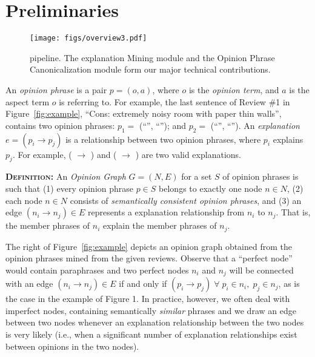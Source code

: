 \section{Preliminaries} \label{sec:overview}
\begin{figure}[t]
    \centering
    \texttt{[image: figs/overview3.pdf]}
    \caption{\system{} pipeline. The explanation Mining module and the Opinion Phrase Canonicalization module form our major technical contributions.}
    \label{fig:overview}
    \vspace{-2mm}
\end{figure}


An \textsl{opinion phrase} is a pair $p=(o, a)$, where $o$ is the \textsl{opinion term}, and $a$ is the aspect term $o$ is referring to. 
For example, the last sentence of Review \#1 in Figure~\ref{fig:example}, ``Cons: extremely noisy room with paper thin walls'', contains two opinion phrases: $p_1=$ (``'', ``''); and $p_2=$ (``'', ``''). 
An \textsl{explanation} $e = (p_i\rightarrow p_j)$ is a relationship between two opinion phrases, where $p_i$ explains $p_j$. For example, ( $\rightarrow$ ) and ( $\rightarrow$ ) are two valid explanations.\smallskip

\noindent \textsc{\textbf{Definition:}} An \textsl{Opinion  Graph} $G = (N,E)$ for a set $S$ of opinion phrases is such that 
(1) every opinion phrase $p\in S$ belongs to exactly one node $n\in N$,
(2) each node $n\in N$ consists of {\em semantically consistent opinion phrases}, and 
(3) an edge \mbox{$(n_i\rightarrow n_j) \in E$} represents a explanation relationship from $n_i$ to $n_j$. That is, the member phrases of $n_i$ explain the member phrases of $n_j$.\smallskip

The right of Figure~\ref{fig:example} depicts an opinion graph obtained from the opinion phrases mined from the given reviews. Observe that a ``perfect node'' would contain paraphrases and two perfect nodes $n_i$ and $n_j$ will be connected with an edge \mbox{$(n_i\rightarrow n_j) \in E$} if and only if $(p_i\rightarrow p_j) \; \forall \; p_i \in n_i, \; p_j \in n_j$, as is the case in the example of Figure 1. In practice, however, we often deal with imperfect nodes, containing semantically \textsl{similar} phrases and we draw an edge between two nodes whenever
an explanation relationship between the two nodes is very likely (i.e., when a significant number of explanation relationships exist between opinions in the two nodes).


